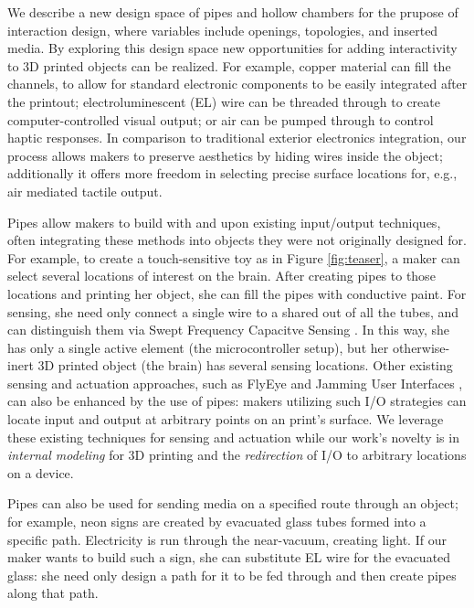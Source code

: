 We describe a new design space of pipes and hollow chambers for the prupose of interaction design, where variables include openings, topologies, and inserted media. By exploring this design space new opportunities for adding interactivity to 3D printed objects can be realized. For example, copper material can fill the channels, to allow for standard electronic components to be easily integrated after the printout; electroluminescent (EL) wire can be threaded through to create computer-controlled visual output; or air can be pumped through to control haptic responses.  In comparison to traditional exterior electronics integration, our process allows makers to preserve aesthetics by hiding wires inside the object; additionally it offers more freedom in selecting precise surface locations for, e.g., air mediated tactile output.

 
Pipes allow makers to build with and upon existing input/output techniques, often integrating these methods into objects they were not originally designed for.   For example, to create a touch-sensitive toy as in Figure \ref{fig:teaser}, a maker can select several locations of interest on the brain.  After creating pipes to those locations and printing her object, she can fill the pipes with conductive paint.  For sensing, she need only connect a single wire to a shared out of all the tubes, and can distinguish them via Swept Frequency Capacitve Sensing \cite{Sato-touche}.  In this way, she has only a single active element (the microcontroller setup), but her otherwise-inert 3D printed object (the brain) has several sensing locations.  Other existing sensing and actuation approaches, such as FlyEye \cite{Wimmer-flyeye} and Jamming User Interfaces \cite{Follmer-jamming}, can also be enhanced by the use of pipes: makers utilizing such I/O strategies can locate input and output at arbitrary points on an print's surface.  We leverage these existing techniques for sensing and actuation while our work's novelty is in \emph{internal modeling} for 3D printing and the \emph{redirection} of I/O to arbitrary locations on a device.

  
Pipes can also be used for sending media on a specified route through an object; for example, neon signs are created by evacuated glass tubes formed into a specific path.  Electricity is run through the near-vacuum, creating light.  If our maker wants to build such a sign, she can substitute EL wire for the evacuated glass: she need only design a path for it to be fed through and then create pipes along that path.

